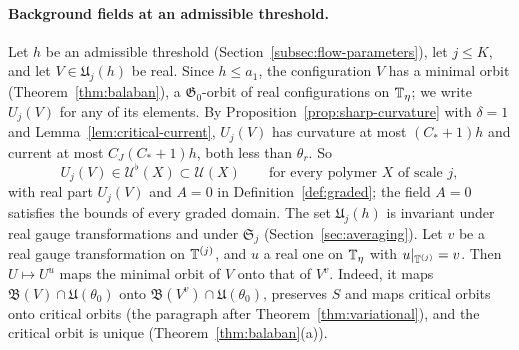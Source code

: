 \paragraph{Background fields at an admissible threshold.} Let $h$ be an admissible threshold (Section~\ref{subsec:flow-parameters}), let $j\le K$, and let $V\in\mathfrak U_j(h)$ be real. Since $h\le a_1$, the configuration $V$ has a minimal orbit (Theorem~\ref{thm:balaban}), a $\mathfrak G_0$-orbit of real configurations on $\mathbb T_\eta$; we write $U_j(V)$ for any of its elements. By Proposition~\ref{prop:sharp-curvature} with $\delta=1$ and Lemma~\ref{lem:critical-current}, $U_j(V)$ has curvature at most $(C_*+1)h$ and current at most $C_J(C_*+1)h$, both less than $\theta_r$. So
\[
U_j(V)\in\mathcal U^\flat(X)\subset\mathcal U(X)\qquad\text{for every polymer $X$ of scale $j$},
\]
with real part $U_j(V)$ and $A=0$ in Definition~\ref{def:graded}; the field $A=0$ satisfies the bounds of every graded domain. The set $\mathfrak U_j(h)$ is invariant under real gauge transformations and under $\mathfrak S_j$ (Section~\ref{sec:averaging}). Let $v$ be a real gauge transformation on $\mathbb T^{(j)}$, and $u$ a real one on $\mathbb T_\eta$ with $u|_{\mathbb T^{(j)}}=v$. Then $U\mapsto U^u$ maps the minimal orbit of $V$ onto that of $V^v$. Indeed, it maps $\mathfrak B(V)\cap\mathfrak U(\theta_0)$ onto $\mathfrak B(V^v)\cap\mathfrak U(\theta_0)$, preserves $S$ and maps critical orbits onto critical orbits (the paragraph after Theorem~\ref{thm:variational}), and the critical orbit is unique (Theorem~\ref{thm:balaban}(a)).

